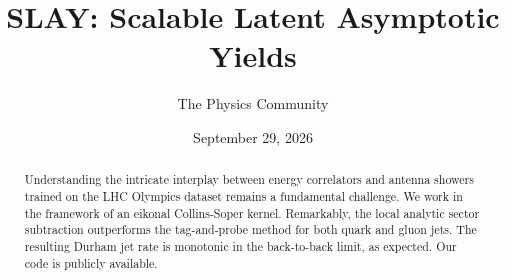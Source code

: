 \documentclass[11pt]{article}
\title{SLAY: Scalable Latent Asymptotic Yields}
\author{The Physics Community}
\date{September 29, 2026}
\numberwithin{equation}{section}
\theoremstyle{definition}
\theoremstyle{remark}
\begin{document}
\maketitle
\begin{abstract}
Understanding the intricate interplay between energy correlators and
antenna showers trained on the LHC Olympics dataset remains a
fundamental challenge. We work in the framework of an eikonal
Collins-Soper kernel. Remarkably, the local analytic sector subtraction
outperforms the tag-and-probe method for both quark and gluon jets. The
resulting Durham jet rate is monotonic in the back-to-back limit, as
expected. Our code is publicly available.
\end{abstract}
\tableofcontents





\nocite{*}


\end{document}
